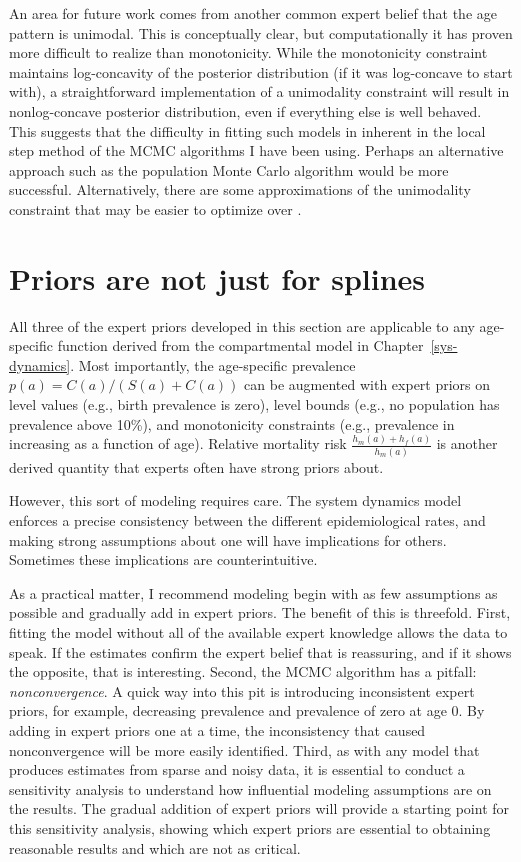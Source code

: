 An area for future work comes from another common expert belief that
the age pattern is unimodal.  This is conceptually clear, but
computationally it has proven more difficult to realize than
monotonicity.  While the monotonicity constraint maintains
log-concavity of the posterior distribution (if it was log-concave to
start with), a straightforward implementation of a unimodality
constraint will result in nonlog-concave posterior distribution, even
if everything else is well behaved.  This suggests that the difficulty
in fitting such models in inherent in the local step method of the
MCMC algorithms I have been using.  Perhaps an alternative approach
such as the population Monte Carlo algorithm would be more successful.
Alternatively, there are some approximations of the unimodality
constraint that may be easier to optimize over \cite{Papp[KP6]]}.

\section{Priors are not just for splines}
All three of the expert priors developed in this section are
applicable to any age-specific function derived from the compartmental
model in Chapter~\ref{sys-dynamics}. Most importantly, the
age-specific prevalence $p(a) = C(a)/(S(a)+C(a))$ can be augmented with expert
priors on level values (e.g., birth prevalence is zero), level bounds
(e.g., no population has prevalence above 10\%), and monotonicity
constraints (e.g., prevalence in increasing as a function of
age). Relative mortality risk $\frac{h_m(a)+h_f(a)}{h_m(a)}$ is another derived quantity that
experts often have strong priors about.

However, this sort of modeling requires care. The system dynamics
model enforces a precise consistency between the different
epidemiological rates, and making strong assumptions about one will
have implications for others.  Sometimes these implications are
counterintuitive.

As a practical matter, I recommend modeling begin with as few
assumptions as possible and gradually add in expert priors. The
benefit of this is threefold.  First, fitting the model without all of
the available expert knowledge allows the data to speak.  If the estimates
confirm the expert belief that is reassuring, and if it shows the
opposite, that is interesting. Second, the MCMC algorithm has a
pitfall: \emph{nonconvergence}. A quick way into this pit is
introducing inconsistent expert priors, for example, decreasing
prevalence and prevalence of zero at age $0$. By adding in expert
priors one at a time, the inconsistency that caused nonconvergence
will be more easily identified. Third, as with any model that produces
estimates from sparse and noisy data, it is essential to conduct a
sensitivity analysis to understand how influential modeling
assumptions are on the results.  The gradual addition of expert priors
will provide a starting point for this sensitivity analysis, showing
which expert priors are essential to obtaining reasonable results and
which are not as critical.

